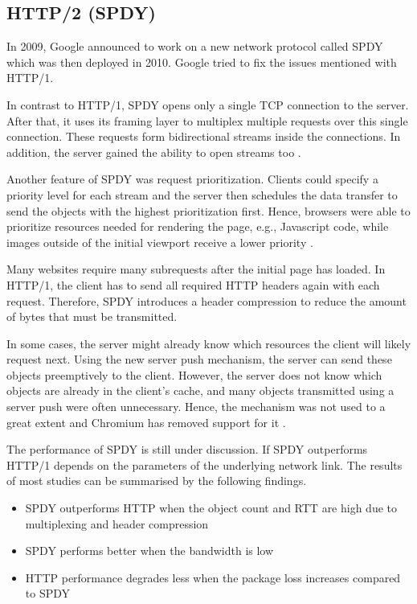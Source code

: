 \documentclass[conference]{IEEEtran}
\begin{document}
\subsection{HTTP/2 (SPDY)}

In 2009, Google announced to work on a new network protocol called SPDY which was then deployed in 2010. Google tried to fix the issues mentioned with HTTP/1.

In contrast to HTTP/1, SPDY opens only a single TCP connection to the server. After that, it uses its framing layer to multiplex multiple requests over this single connection. These requests form bidirectional streams inside the connections. In addition, the server gained the ability to open streams too \cite{HowQuickIsQuic}.

Another feature of SPDY was request prioritization. Clients could specify a priority level for each stream and the server then schedules the data transfer to send the objects with the highest prioritization first. Hence, browsers were able to prioritize resources needed for rendering the page, e.g., Javascript code, while images outside of the initial viewport receive a lower priority \cite{HowQuickIsQuic}.

Many websites require many subrequests after the initial page has loaded. In HTTP/1, the client has to send all required HTTP headers again with each request. Therefore, SPDY introduces a header compression to reduce the amount of bytes that must be transmitted.

In some cases, the server might already know which resources the client will likely request next. Using the new server push mechanism, the server can send these objects preemptively to the client. However, the server does not know which objects are already in the client's cache, and many objects transmitted using a server push were often unnecessary. Hence, the mechanism was not used to a great extent and Chromium has removed support for it \cite{RemoveServerPush}.


The performance of SPDY is still under discussion. If SPDY outperforms HTTP/1 depends on the parameters of the underlying network link. The results of most studies can be summarised by the following findings.

\begin{itemize}
  \item SPDY outperforms HTTP when the object count and RTT are high due to multiplexing and header compression
  \item SPDY performs better when the bandwidth is low
  \item HTTP performance degrades less when the package loss increases compared to SPDY
\end{itemize}
\end{document}
